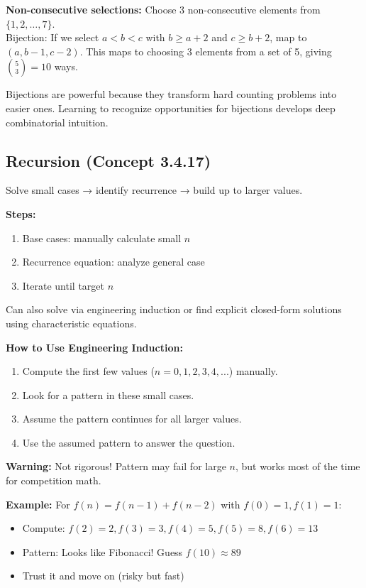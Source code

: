 \documentclass[12pt]{extarticle}
\begin{document}
\begin{examplebox}
\textbf{Non-consecutive selections:} Choose 3 non-consecutive elements from $\{1, 2, \ldots, 7\}$. \\
Bijection: If we select $a < b < c$ with $b \ge a+2$ and $c \ge b+2$, map to $(a, b-1, c-2)$. This maps to choosing 3 elements from a set of 5, giving $\binom{5}{3} = 10$ ways.
\end{examplebox}

\begin{remarkbox}
Bijections are powerful because they transform hard counting problems into easier ones. Learning to recognize opportunities for bijections develops deep combinatorial intuition.
\end{remarkbox}
\newpage
\subsection{Recursion (Concept 3.4.17)}
Solve small cases → identify recurrence → build up to larger values.  

\textbf{Steps:}
\begin{enumerate}
    \item Base cases: manually calculate small $n$
    \item Recurrence equation: analyze general case
    \item Iterate until target $n$
\end{enumerate}

\begin{remarkbox}
Can also solve via engineering induction or find explicit closed-form solutions using characteristic equations.
\end{remarkbox}

\begin{tcolorbox}[colback=yellow!10!white,colframe=orange!75!black,title=Engineering Induction (Pattern Guessing)]
\textbf{How to Use Engineering Induction:}
\begin{enumerate}
    \item Compute the first few values ($n=0,1,2,3,4,...$) manually.
    \item Look for a pattern in these small cases.
    \item Assume the pattern continues for all larger values.
    \item Use the assumed pattern to answer the question.
\end{enumerate}
\textbf{Warning:} Not rigorous! Pattern may fail for large $n$, but works most of the time for competition math.

\textbf{Example:} For $f(n) = f(n-1) + f(n-2)$ with $f(0)=1, f(1)=1$:
\begin{itemize}
    \item Compute: $f(2)=2, f(3)=3, f(4)=5, f(5)=8, f(6)=13$
    \item Pattern: Looks like Fibonacci! Guess $f(10) \approx 89$
    \item Trust it and move on (risky but fast)
\end{itemize}
\end{tcolorbox}
\end{document}
